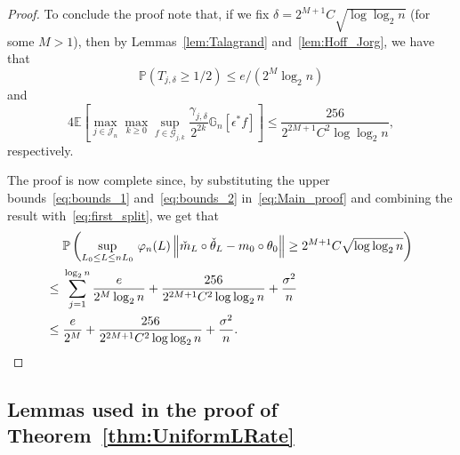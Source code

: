 \begin{proof}
To conclude the proof note that, if we fix $\delta= 2^{{M+1}}C \sqrt{\log \log_2 n}$ (for some $M>1$), then  by Lemmas~\ref{lem:Talagrand} and~\ref{lem:Hoff_Jorg}, we have that 
\begin{equation}\label{eq:bounds_1}
\mathbb{P}(T_{j,\delta} \ge 1/2) \le e/ (2^M \log_2 n) 
\end{equation}
and 
\begin{equation}\label{eq:bounds_2}
 4\mathbb{E}\left[\max_{j\in \mathcal{J}_n}\max_{k \ge 0}\sup_{f\in\mathcal{G}_{j,k}} \frac{\gamma_{j,\delta}}{2^{2k}}\mathbb{G}_n[\epsilon^* f]\right] \le \frac{256}{2^{2M+1} C^2 \log\log_2n},
 \end{equation} respectively.

 The proof is now complete since, by substituting the upper bounds~\eqref{eq:bounds_1} and~\eqref{eq:bounds_2} in~\eqref{eq:Main_proof} and combining the result with~\eqref{eq:first_split}, we get that 
\begin{align}
&\mathbb{P}\left(\sup_{L_0 \le L \le nL_0}\,\varphi_n(L)\left\lVert\check{m}_L\circ\check{\theta}_L - m_0\circ\theta_0\right\rVert \ge 2^{{M+1}}C \sqrt{\log \log_2 n}\right)\\
  \le{}& \sum_{j=1}^{\log_2 n} \frac{e}{2^M \log_2n} + \frac{256}{2^{2M+1} C^2\log\log_2n}+\frac{\sigma^2}{n}\\
  \le{}& \frac{e}{2^M} +\frac{256}{2^{2M+1} C^2 \log\log_2n}+ \frac{\sigma^2}{n}.\qedhere
\end{align}
\end{proof}
\subsection{Lemmas used in the proof of Theorem~\ref{thm:UniformLRate}} %
\label{sub:lemmas_used_in_the_proof_of_theorem_thm:uniformlrate}


